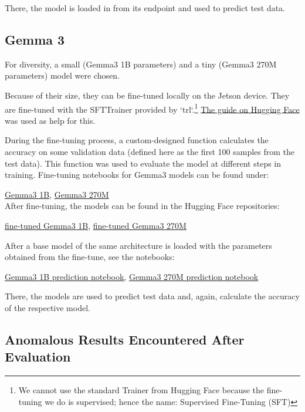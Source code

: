 \documentclass{article}
\begin{document}
There, the model is loaded in from its endpoint and used to predict test data.

\subsection{Gemma 3}
For diversity, a small (Gemma3 1B parameters) and a tiny (Gemma3 270M parameters) model were chosen.

Because of their size, they can be fine-tuned locally on the Jetson device. They are fine-tuned with the SFTTrainer provided by `trl`.\footnote{We cannot use the standard Trainer from Hugging Face because the fine-tuning we do is supervised; hence the name: Supervised Fine-Tuning (SFT)} \href{https://huggingface.co/docs/trl/en/sft_trainer}{The guide on Hugging Face} was used as help for this.

During the fine-tuning process, a custom-designed function calculates the accuracy on some validation data (defined here as the first 100 samples from the test data). This function was used to evaluate the model at different steps in training. Fine-tuning notebooks for Gemma3 models can be found under:

\href{https://github.com/AntonStantan/matura/blob/main/pre-trained-tranformers/big_gemma_huggingface.ipynb}{Gemma3 1B}, \href{https://github.com/AntonStantan/matura/blob/main/pre-trained-tranformers/gemma_huggingface.ipynb}{Gemma3 270M}
\\[2em]
After fine-tuning, the models can be found in the Hugging Face repositories:

\href{https://huggingface.co/AntonBOOM/big_output}{fine-tuned Gemma3 1B},
\href{https://huggingface.co/AntonBOOM/output1}{fine-tuned Gemma3 270M}

After a base model of the same architecture is loaded with the parameters obtained from the fine-tune, see the notebooks:

\href{https://github.com/AntonStantan/matura/blob/main/pre-trained-tranformers/big_gemma_huggingface_predict.ipynb}{Gemma3 1B prediction notebook},
\href{https://github.com/AntonStantan/matura/blob/main/pre-trained-tranformers/gemma-huggingface-predict.ipynb}{Gemma3 270M prediction notebook}

There, the models are used to predict test data and, again, calculate the accuracy of the respective model.

\subsection{Anomalous Results Encountered After Evaluation}
\end{document}
